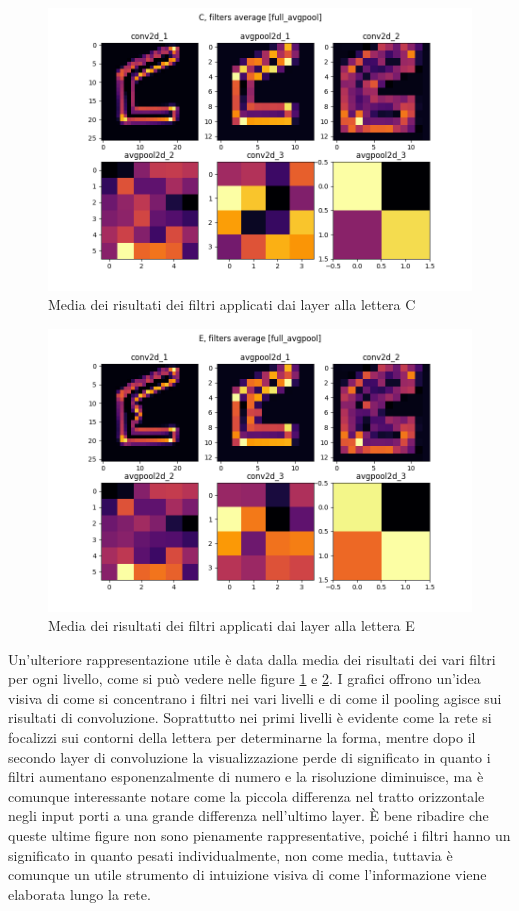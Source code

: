 \documentclass[a4paper,12pt]{article}
\begin{document}
\begin{figure}[H]
\centering
\includegraphics[width=.6\linewidth]{images/C_full_avgpool_filters_avg.png}
\caption{Media dei risultati dei filtri applicati dai layer alla lettera C}
\label{avg_filters_C}
\end{figure}

\begin{figure}[H]
\centering
\includegraphics[width=.6\linewidth]{images/E_full_avgpool_filters_avg.png}
\caption{Media dei risultati dei filtri applicati dai layer alla lettera E}
\label{avg_filters_E}
\end{figure}

Un'ulteriore rappresentazione utile è data dalla media dei risultati dei vari filtri per ogni livello, come si può vedere nelle figure \ref{avg_filters_C} e \ref{avg_filters_E}. I grafici offrono un'idea visiva di come si concentrano i filtri nei vari livelli e di come il pooling agisce sui risultati di convoluzione.
Soprattutto nei primi livelli è evidente come la rete si focalizzi sui contorni della lettera per determinarne la forma, mentre dopo il secondo layer di convoluzione la visualizzazione perde di significato in quanto i filtri aumentano esponenzalmente di numero e la risoluzione diminuisce, ma è comunque interessante notare come la piccola differenza nel tratto orizzontale negli input porti a una grande differenza nell'ultimo layer.
È bene ribadire che queste ultime figure non sono pienamente rappresentative, poiché i filtri hanno un significato in quanto pesati individualmente, non come media, tuttavia è comunque un utile strumento di intuizione visiva di come l'informazione viene elaborata lungo la rete.
\end{document}
